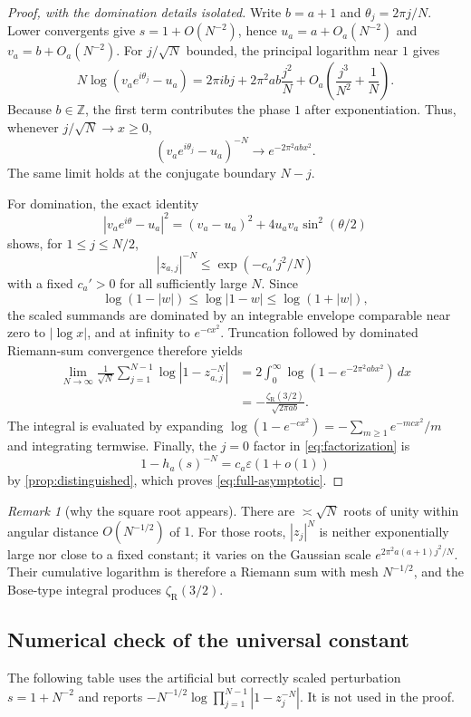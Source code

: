 \documentclass[11pt]{article}
\theoremstyle{definition}
\theoremstyle{remark}
\newtheorem{remark}[theorem]{Remark}
\newcommand{\ZZ}{\mathbb Z}
\newcommand{\eps}{\varepsilon}
\newcommand{\zR}{\zeta_{\!\mathrm R}}
\begin{document}
\begin{proof}[Proof, with the domination details isolated]
Write \(b=a+1\) and \(\theta_j=2\pi j/N\).  Lower convergents give
\(s=1+O(N^{-2})\), hence \(u_a=a+O_a(N^{-2})\) and
\(v_a=b+O_a(N^{-2})\).  For \(j/\sqrt N\) bounded, the principal logarithm near \(1\) gives
\begin{equation}\label{eq:local-log}
N\log(v_ae^{i\theta_j}-u_a)
=2\pi i b j+2\pi^2ab\frac{j^2}{N}
+O_a\!\left(\frac{j^3}{N^2}+\frac1N\right).
\end{equation}
Because \(b\in\ZZ\), the first term contributes the phase \(1\) after exponentiation.  Thus, whenever \(j/\sqrt N\to x\ge0\),
\[
(v_ae^{i\theta_j}-u_a)^{-N}
\longrightarrow e^{-2\pi^2abx^2}.
\]
The same limit holds at the conjugate boundary \(N-j\).

For domination, the exact identity
\[
|v_ae^{i\theta}-u_a|^2
=(v_a-u_a)^2+4u_av_a\sin^2(\theta/2)
\]
shows, for \(1\le j\le N/2\),
\[
|z_{a,j}|^{-N}\le \exp(-c_a'j^2/N)
\]
with a fixed \(c_a'>0\) for all sufficiently large \(N\).  Since
\[
\log(1-|w|)\le\log|1-w|\le\log(1+|w|),
\]
the scaled summands are dominated by an integrable envelope comparable near zero to \(|\log x|\), and at infinity to \(e^{-c x^2}\).  Truncation followed by dominated Riemann-sum convergence therefore yields
\begin{align*}
\lim_{N\to\infty}\frac1{\sqrt N}
\sum_{j=1}^{N-1}\log|1-z_{a,j}^{-N}|
&=2\int_0^\infty\log(1-e^{-2\pi^2abx^2})\,dx\\
&=-\frac{\zR(3/2)}{\sqrt{2\pi ab}}.
\end{align*}
The integral is evaluated by expanding
\(\log(1-e^{-cx^2})=-\sum_{m\ge1}e^{-mcx^2}/m\) and integrating termwise.  Finally, the \(j=0\) factor in \eqref{eq:factorization} is
\[
1-h_a(s)^{-N}=c_a\eps(1+o(1))
\]
by \cref{prop:distinguished}, which proves \eqref{eq:full-asymptotic}.
\end{proof}

\begin{remark}[why the square root appears]
There are \(\asymp\sqrt N\) roots of unity within angular distance \(O(N^{-1/2})\) of \(1\).  For those roots, \(|z_j|^N\) is neither exponentially large nor close to a fixed constant; it varies on the Gaussian scale \(e^{2\pi^2a(a+1)j^2/N}\).  Their cumulative logarithm is therefore a Riemann sum with mesh \(N^{-1/2}\), and the Bose-type integral produces \(\zR(3/2)\).
\end{remark}

\subsection{Numerical check of the universal constant}
The following table uses the artificial but correctly scaled perturbation
\(s=1+N^{-2}\) and reports
\(-N^{-1/2}\log\prod_{j=1}^{N-1}|1-z_j^{-N}|\).  It is not used in the proof.
\end{document}

